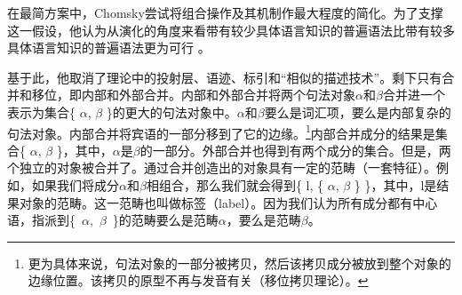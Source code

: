 在最简方案中，Chomsky尝试将组合操作及其机制作最大程度的简化。为了支撑这一假设，他认为从演化的角度来看带有较少具体语言知识的普遍语法比带有较多具体语言知识的普遍语法更为可行 \citep[]{Chomsky2008a}。

基于此，他取消了\xbarc 理论中的投射层、语迹、标引和“相似的描述技术”\citep[]{Chomsky2008a}。剩下只有合并和移位，即内部和外部合并。内部和外部合并将两个句法对象$\alpha$和$\beta$合并进一个表示为集合\{ $\alpha$, $\beta$ \}的更大的句法对象中。$\alpha$和$\beta$要么是词汇项，要么是内部复杂的句法对象。内部合并将宾语的一部分移到了它的边缘。\footnote{%
更为具体来说，句法对象的一部分被拷贝，然后该拷贝成分被放到整个对象的边缘位置。该拷贝的原型不再与发音有关（移位拷贝理论）。
}内部合并成分的结果是集合\{ $\alpha$, $\beta$ \}，其中，$\alpha$是$\beta$的一部分。外部合并也得到有两个成分的集合。但是，两个独立的对象被合并了。通过合并创造出的对象具有一定的范畴（一套特征）。例如，如果我们将成分$\alpha$和$\beta$相组合，那么我们就会得到\{ l, \{ $\alpha$, $\beta$ \} \}，其中，l是结果对象的范畴。这一范畴也叫做标签（label）。因为我们认为所有成分都有中心语，指派到\{~$\alpha$,~$\beta$~\}的范畴要么是范畴$\alpha$，要么是范畴$\beta$。
